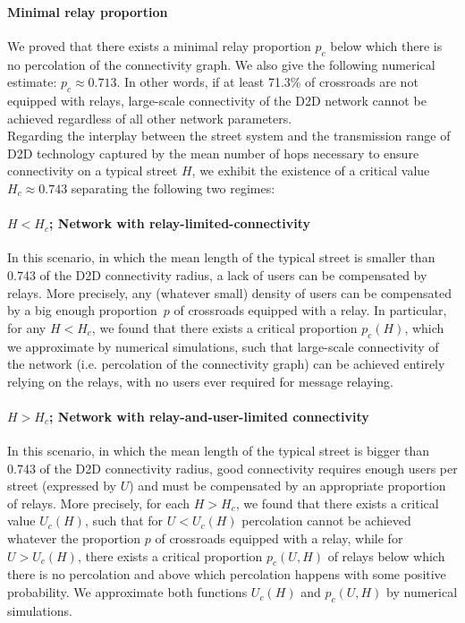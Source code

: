 \documentclass[conference]{IEEEtran}
\begin{document}
\paragraph{Minimal relay proportion} We proved that there exists a minimal relay proportion $p_c$ below which there
  is no percolation of the connectivity graph. We also give the following numerical estimate: $p_c \approx 0.713$. In other words, if
  at least 71.3\% of crossroads are not equipped with relays, large-scale
  connectivity of the D2D network cannot be achieved regardless of all
  other network parameters.
\\

Regarding the interplay between the street system and the transmission range of D2D technology
captured by the mean number of hops necessary to
ensure connectivity on a typical street $H$, we exhibit the existence of a  critical value  $H_c\approx 0.743$ separating the following two regimes:
\paragraph{$H<H_c$; Network with relay-limited-connectivity} In this scenario, in which the mean length of the typical  street
  is smaller  than 0.743 of the D2D connectivity radius,
  a lack of users can be compensated by
  relays. More precisely, 
  any (whatever small) density of users can be compensated  by a big
  enough proportion~$p$ of crossroads equipped with a relay. In
  particular, for any $H<H_c$, we found that there exists a critical proportion $p_c(H)$,
  which we approximate by numerical simulations, such that large-scale connectivity of the network (i.e. percolation of the connectivity graph) can be achieved
  entirely relying on the relays, with no users ever required for message relaying.
  \paragraph{$H>H_c$; Network with relay-and-user-limited connectivity}
  In this scenario, in which the mean length of the typical  street is
  bigger  than 0.743  of the D2D connectivity radius,
 good connectivity requires enough users per street (expressed by $U$)  and must be compensated by an appropriate proportion of relays. More precisely, for each $H>H_c$, we found that there exists a critical value $U_c(H)$, such that for $U<U_c(H)$ percolation  cannot be achieved whatever the proportion $p$ of crossroads   equipped with a relay, while for  $U>U_c(H)$, there exists a critical
  proportion $p_c(U,H)$ of relays below which there is no percolation
  and above which percolation happens with some  positive probability. We
  approximate both functions $U_c(H)$ and $p_c(U,H)$ by numerical simulations.
\end{document}
